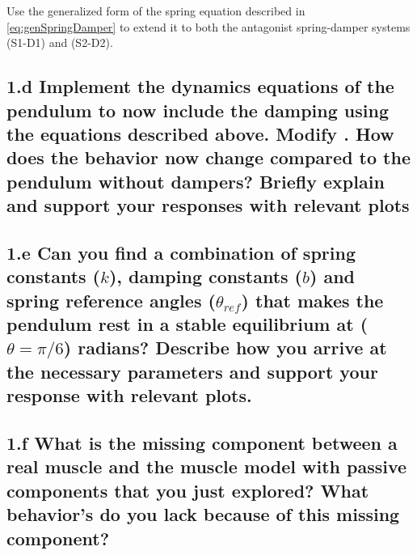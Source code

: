 \documentclass{cmc}
\begin{document}
Use the generalized form of the spring equation described in
\ref{eq:genSpringDamper} to extend it to both the antagonist
spring-damper systems (S1-D1) and (S2-D2).


\subsection*{1.d Implement the dynamics equations of the pendulum to
  now include the damping using the equations described above. Modify
  .  How does the
  behavior now change compared to the pendulum without dampers? Briefly explain and support your
  responses with relevant plots}


\subsection*{1.e Can you find a combination of spring constants ($k$),
  damping constants ($b$) and spring reference angles ($\theta_{ref}$)
  that makes the pendulum rest in a stable equilibrium at
  ($\theta = \pi/6$) radians? Describe how you arrive at the necessary
  parameters and support your response with relevant plots.}


\subsection*{1.f What is the missing component between a real muscle
  and the muscle model with passive components that you just explored?
  What behavior's do you lack because of this missing component?}
\end{document}
